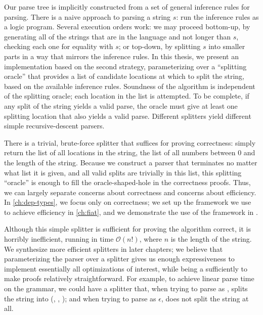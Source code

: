   Our parse tree is implicitly constructed from a set of general inference rules for parsing.  There is a naive approach to parsing a string $s$: run the inference rules as a logic program.  Several execution orders work: we may proceed bottom-up, by generating all of the strings that are in the language and not longer than $s$, checking each one for equality with $s$; or top-down, by splitting $s$ into smaller parts in a way that mirrors the inference rules.  In this thesis, we present an implementation based on the second strategy, parameterizing over a ``splitting oracle'' that provides a list of candidate locations at which to split the string, based on the available inference rules.  Soundness of the algorithm is independent of the splitting oracle; each location in the list is attempted.  To be complete, if any split of the string yields a valid parse, the oracle must give at least one splitting location that also yields a valid parse.  Different splitters yield different simple recursive-descent parsers. \label{sec:splitting-oracle} %

  There is a trivial, brute-force splitter that suffices for proving correctness: simply return the list of all locations in the string, the list of all numbers between 0 and the length of the string.  Because we construct a parser that terminates no matter what list it is given, and all valid splits are trivially in this list, this splitting ``oracle'' is enough to fill the oracle-shaped-hole in the correctness proofs.  Thus, we can largely separate concerns about correctness and concerns about efficiency.  In \autoref{ch:dep-types}, we focus only on correctness; we set up the framework we use to achieve efficiency in \autoref{ch:fiat}, and we demonstrate the use of the framework in .

  Although this simple splitter is sufficient for proving the algorithm correct, it is horribly inefficient, running in time $\mathcal O(n!)$, where $n$ is the length of the string.  We synthesize more efficient splitters in later chapters; we believe that parameterizing the parser over a splitter gives us enough expressiveness to implement essentially all optimizations of interest, while being a sufficiently  to make proofs relatively straightforward.  For example, to achieve linear parse time on the  grammar, we could have a splitter that, when trying to parse  as , splits the string into (, , ); and when trying to parse  as $\epsilon$, does not split the string at all.
  
